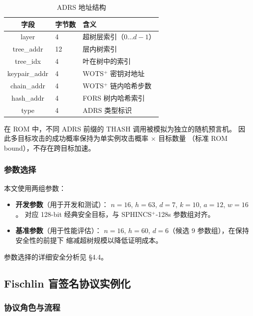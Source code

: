 \documentclass[11pt,a4paper]{ctexart}
\begin{document}
\begin{table}[h]
\centering
\caption{ADRS 地址结构}
\label{tab:adrs}
\begin{tabular}{@{}cll@{}}
\toprule
\textbf{字段} & \textbf{字节数} & \textbf{含义} \\
\midrule
layer        & 4  & 超树层索引（$0 \ldots d-1$） \\
tree\_addr   & 12 & 层内树索引 \\
tree\_idx    & 4  & 叶在树中的索引 \\
keypair\_addr & 4  & WOTS$^+$ 密钥对地址 \\
chain\_addr  & 4  & WOTS$^+$ 链内哈希步数 \\
hash\_addr   & 4  & FORS 树内哈希索引 \\
type         & 4  & ADRS 类型标识 \\
\bottomrule
\end{tabular}
\end{table}

在 ROM 中，不同 ADRS 前缀的 THASH 调用被模拟为独立的随机预言机。
因此多目标攻击的成功概率保持为单实例攻击概率 $\times$ 目标数量
（标准 ROM bound），不存在跨目标加速。

\subsubsection{参数选择}

本文使用两组参数：

\begin{itemize}[leftmargin=*]
\item \textbf{开发参数}（用于开发和测试）：
$n = 16$, $h = 63$, $d = 7$, $k = 10$, $a = 12$, $w = 16$。
对应 128-bit 经典安全目标，与 SPHINCS$^+$-128s 参数组对齐。
\item \textbf{基准参数}（用于性能评估）：
$n = 16$, $h = 60$, $d = 6$（候选 9 参数组），在保持安全性的前提下
缩减超树规模以降低证明成本。
\end{itemize}

参数选择的详细安全分析见 §4.4。

\subsection{Fischlin 盲签名协议实例化}

\subsubsection{协议角色与流程}
\end{document}
